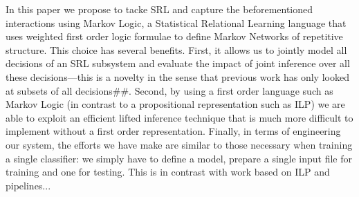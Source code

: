 In this paper we propose to tacke SRL and capture the beforementioned
interactions using Markov Logic, a Statistical Relational Learning
language that uses weighted first order logic formulae to define Markov
Networks of repetitive structure. This choice has several benefits.
First, it allows us to jointly model all decisions of an SRL subsystem
and evaluate the impact of joint inference over all these decisions---this
is a novelty in the sense that previous work has only looked at subsets
of all decisions\#\#. Second, by using a first order language such
as Markov Logic (in contrast to a propositional representation such
as ILP) we are able to exploit an efficient lifted inference technique
that is much more difficult to implement without a first order representation.
Finally, in terms of engineering our system, the efforts we have make
are similar to those necessary when training a single classifier:
we simply have to define a model, prepare a single input file for
training and one for testing. This is in contrast with work based
on ILP and pipelines...
